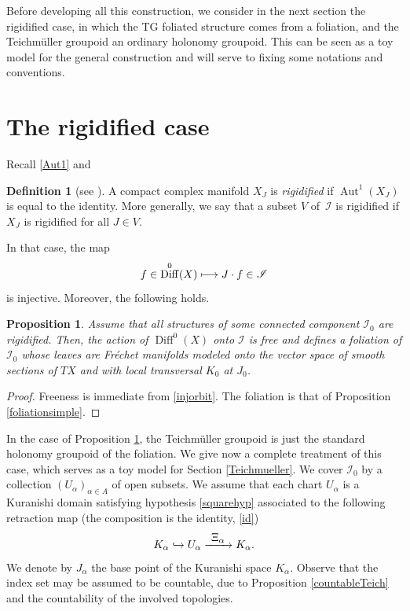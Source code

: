 \documentclass[JEP,XML,SOM,Unicode]{cedram}
\let\mathcal\mathscr
\def\mto{\mathchoice{\longmapsto}{\mapsto}{\mapsto}{\mapsto}}
\def\hto{\mathrel{\lhook\joinrel\to}}
\def\To#1{\mathchoice{\xrightarrow{\textstyle\kern4pt#1\kern3pt}}{\stackrel{#1}{\longrightarrow}}{}{}}
\DeclareMathOperator{\Aut}{Aut}
\DeclareMathOperator{\Diff}{Diff}
\theoremstyle{plain}
\newtheorem{proposition}[theorem]{Proposition}
\theoremstyle{definition}
\newtheorem{definition}[theorem]{Definition}
\theoremstyle{remark}
\numberwithin{equation}{section}
\newcommand{\cI}{\mathcal{I}}
\begin{document}
Before developing all this construction, we consider in the next section the rigidified case, in which the TG foliated structure comes from a foliation, and the Teichmüller groupoid an ordinary holonomy groupoid. This can be seen as a toy model for the general construction and will serve to fixing some notations and conventions.

\section{The rigidified case}
\label{rigidified}

Recall \eqref{Aut1} and

\begin{definition}[see {\cite[Def.\,12]{Catsurvey}}]
\label{rig}
A compact complex manifold $X_J$ is \emph{rigidified} if $\Aut^1(X_J)$ is equal to the identity. More generally, we say that a subset $V$ of~$\cI$ is rigidified if $X_J$ is rigidified for all $J\in V$.
\end{definition}

In that case, the map
\begin{equation}
\label{injorbit}
f\in\Diff^0(X)\mto J\cdot f\in\cI
\end{equation}
is injective. Moreover, the following holds.

\begin{proposition}
\label{rigidconsequences}
Assume that all structures of some connected component $\cI_0$ are rigidified. Then, the action of $\Diff^0(X)$ onto $\cI$ is free and defines a foliation of $\cI_0$ whose leaves are Fréchet manifolds modeled onto the vector space of smooth sections of $TX$ and with local transversal $K_0$ at $J_0$.
\end{proposition}

\begin{proof}
Freeness is immediate from \eqref{injorbit}. The foliation is that of Proposition \ref{foliationsimple}.
\end{proof}

In the case of Proposition \ref{rigidconsequences}, the Teichmüller groupoid is just the standard holonomy groupoid of the foliation. We give now a complete treatment of this case, which serves as a toy model for Section \ref{Teichmueller}. We cover $\cI_0$ by a collection $(U_\alpha)_{\alpha\in A}$ of open subsets. We assume that each chart $U_{\alpha}$ is a Kuranishi domain satisfying hypothesis \ref{squarehyp} associated to the following retraction map (the composition is the identity, \cf \eqref{id})%
\begin{equation}
\label{id2rigid}
K_{\alpha}\hto U_{\alpha}\To{\Xi_{\alpha}}K_{\alpha}.
\end{equation}
We denote by $J_\alpha$ the base point of the Kuranishi space $K_\alpha$. Observe that the index set may be assumed to be countable, due to Proposition \ref{countableTeich} and the countability of the involved topologies.
\end{document}

